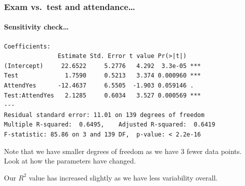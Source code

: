 \documentclass{beamer}\usepackage[]{graphicx}\usepackage[]{xcolor}
\makeatletter
\newenvironment{kframe}{%
 \def\at@end@of@kframe{}%
 \ifinner\ifhmode%
  \def\at@end@of@kframe{\end{minipage}}%
  \begin{minipage}{\columnwidth}%
 \fi\fi%
 \def\FrameCommand##1{\hskip\@totalleftmargin \hskip-\fboxsep
 \colorbox{shadecolor}{##1}\hskip-\fboxsep
     \hskip-\linewidth \hskip-\@totalleftmargin \hskip\columnwidth}%
 \MakeFramed {\advance\hsize-\width
   \@totalleftmargin\z@ \linewidth\hsize
   \@setminipage}}%
 {\par\unskip\endMakeFramed%
 \at@end@of@kframe}
\newenvironment{knitrout}{}{} %
\makeatother
\begin{document}
\begin{frame}[fragile]
\frametitle{Exam vs.\ test \textbf{and} attendance\ldots}
\framesubtitle{Sensitivity check\ldots}
\begin{knitrout}\scriptsize
{}\color{fgcolor}\begin{kframe}
\begin{verbatim}
Coefficients:
               Estimate Std. Error t value Pr(>|t|)    
(Intercept)     22.6522     5.2776   4.292  3.3e-05 ***
Test             1.7590     0.5213   3.374 0.000960 ***
AttendYes      -12.4637     6.5505  -1.903 0.059146 .  
Test:AttendYes   2.1285     0.6034   3.527 0.000569 ***
---
Residual standard error: 11.01 on 139 degrees of freedom
Multiple R-squared:  0.6495,	Adjusted R-squared:  0.6419 
F-statistic: 85.86 on 3 and 139 DF,  p-value: < 2.2e-16
\end{verbatim}
\end{kframe}
\end{knitrout}
\bigskip
Note that we have smaller degrees of freedom as we have 3 fewer data points. 
Look at how the parameters have changed.
\medskip

Our $R^2$ value has increased slightly as we have less variability overall.
\end{frame}
\end{document}
